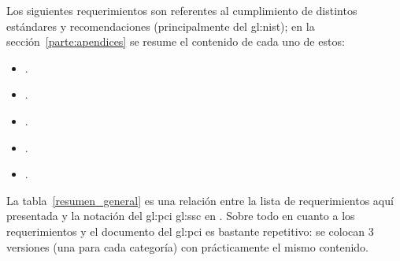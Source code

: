 Los siguientes requerimientos son referentes al cumplimiento
de distintos estándares y recomendaciones (principalmente del \gls{gl:nist});
en la sección~\ref{parte:apendices} se resume el contenido de cada uno de
estos:

\begin{itemize}
  \item {}.
  \item {}.
  \item {}.
  \item {}.
  \item {}.
\end{itemize}

La tabla~\ref{resumen_general} es una relación entre la lista de
requerimientos aquí presentada y la notación del \gls{gl:pci} \gls{gl:ssc} en
\cite{pci_tokens}. Sobre todo en cuanto a los requerimientos
 y
 el documento del \gls{gl:pci} es
bastante repetitivo: se colocan 3 versiones (una para cada categoría) con
prácticamente el mismo contenido.

\newcommand{\columnaUno}{4.0in}
\newcommand{\columnaDos}{2.0in}

